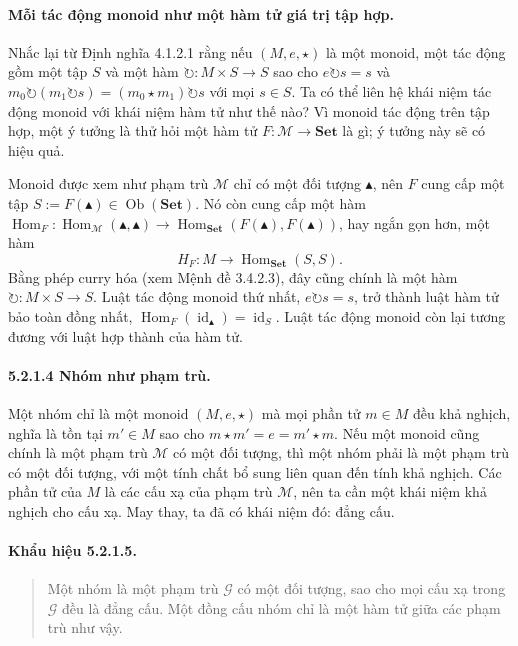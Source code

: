\paragraph{Mỗi tác động monoid như một hàm tử giá trị tập hợp.} Nhắc lại từ Định nghĩa 4.1.2.1 rằng nếu $(M,e,\star)$ là một monoid, một tác động gồm một tập $S$ và một hàm $\circlearrowright:M\times S\to S$ sao cho $e\circlearrowright s=s$ và $m_0\circlearrowright(m_1\circlearrowright s)=(m_0\star m_1)\circlearrowright s$ với mọi $s\in S$. Ta có thể liên hệ khái niệm tác động monoid với khái niệm hàm tử như thế nào? Vì monoid tác động trên tập hợp, một ý tưởng là thử hỏi một hàm tử $F:\mathcal M\to\mathbf{Set}$ là gì; ý tưởng này sẽ có hiệu quả.

Monoid được xem như phạm trù $\mathcal M$ chỉ có một đối tượng $\blacktriangle$, nên $F$ cung cấp một tập $S:=F(\blacktriangle)\in\operatorname{Ob}(\mathbf{Set})$. Nó còn cung cấp một hàm $\operatorname{Hom}_F:\operatorname{Hom}_{\mathcal M}(\blacktriangle,\blacktriangle)\to\operatorname{Hom}_{\mathbf{Set}}(F(\blacktriangle),F(\blacktriangle))$, hay ngắn gọn hơn, một hàm
\[H_F:M\longrightarrow\operatorname{Hom}_{\mathbf{Set}}(S,S).\]
Bằng phép curry hóa (xem Mệnh đề 3.4.2.3), đây cũng chính là một hàm $\circlearrowright:M\times S\to S$. Luật tác động monoid thứ nhất, $e\circlearrowright s=s$, trở thành luật hàm tử bảo toàn đồng nhất, $\operatorname{Hom}_F(\operatorname{id}_{\blacktriangle})=\operatorname{id}_S$. Luật tác động monoid còn lại tương đương với luật hợp thành của hàm tử.
\paragraph{5.2.1.4 Nhóm như phạm trù.} Một nhóm chỉ là một monoid $(M,e,\star)$ mà mọi phần tử $m\in M$ đều khả nghịch, nghĩa là tồn tại $m'\in M$ sao cho $m\star m'=e=m'\star m$. Nếu một monoid cũng chính là một phạm trù $\mathcal M$ có một đối tượng, thì một nhóm phải là một phạm trù có một đối tượng, với một tính chất bổ sung liên quan đến tính khả nghịch. Các phần tử của $M$ là các cấu xạ của phạm trù $\mathcal M$, nên ta cần một khái niệm khả nghịch cho cấu xạ. May thay, ta đã có khái niệm đó: đẳng cấu.
\paragraph{Khẩu hiệu 5.2.1.5.}\begin{quote}Một nhóm là một phạm trù $\mathcal G$ có một đối tượng, sao cho mọi cấu xạ trong $\mathcal G$ đều là đẳng cấu. Một đồng cấu nhóm chỉ là một hàm tử giữa các phạm trù như vậy.\end{quote}

